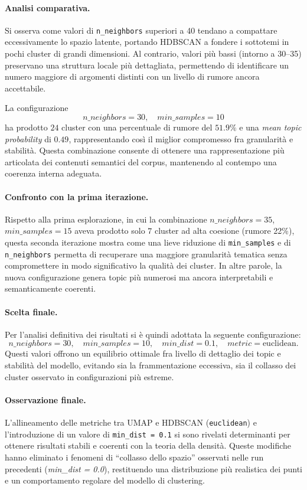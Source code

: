 \paragraph{Analisi comparativa.}
Si osserva come valori di \texttt{n\_neighbors} superiori a 40 tendano a
compattare eccessivamente lo spazio latente, portando HDBSCAN a fondere
i sottotemi in pochi cluster di grandi dimensioni.
Al contrario, valori più bassi (intorno a 30–35) preservano una
struttura locale più dettagliata, permettendo di identificare un numero
maggiore di argomenti distinti con un livello di rumore ancora accettabile.

La configurazione
\[
n\_neighbors = 30, \quad min\_samples = 10
\]
ha prodotto $24$ cluster con una percentuale di rumore del $51.9\%$
e una \emph{mean topic probability} di $0.49$,
rappresentando così il miglior compromesso fra granularità e stabilità.
Questa combinazione consente di ottenere una rappresentazione più articolata
dei contenuti semantici del corpus, mantenendo al contempo una coerenza interna adeguata.

\paragraph{Confronto con la prima iterazione.}
Rispetto alla prima esplorazione, in cui la combinazione
$n\_neighbors = 35$, $min\_samples = 15$ aveva prodotto solo $7$ cluster
ad alta coesione (rumore 22\%),
questa seconda iterazione mostra come una lieve riduzione di
\texttt{min\_samples} e di \texttt{n\_neighbors} permetta di recuperare
una maggiore granularità tematica senza compromettere in modo significativo
la qualità dei cluster.
In altre parole, la nuova configurazione genera topic più numerosi
ma ancora interpretabili e semanticamente coerenti.

\paragraph{Scelta finale.}
Per l’analisi definitiva dei risultati si è quindi adottata la seguente configurazione:
\[
\boxed{
n\_neighbors = 30, \quad min\_samples = 10, \quad min\_dist = 0.1, \quad metric = \text{euclidean}.
}
\]
Questi valori offrono un equilibrio ottimale fra livello di dettaglio dei topic
e stabilità del modello, evitando sia la frammentazione eccessiva,
sia il collasso dei cluster osservato in configurazioni più estreme.

\paragraph{Osservazione finale.}
L’allineamento delle metriche tra UMAP e HDBSCAN (\texttt{euclidean}) e l’introduzione di un valore di \texttt{min\_dist = 0.1}
si sono rivelati determinanti per ottenere risultati stabili e coerenti con la teoria della densità.
Queste modifiche hanno eliminato i fenomeni di ``collasso dello spazio'' osservati nelle run precedenti
(\emph{min\_dist = 0.0}), restituendo una distribuzione più realistica dei punti e un comportamento regolare
del modello di clustering.

